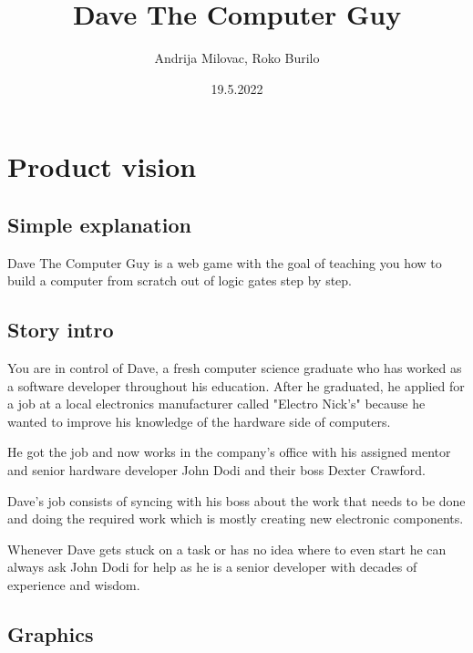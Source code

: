 \documentclass[12pt]{article}
\author{Andrija Milovac, Roko Burilo}
\title{Dave The Computer Guy}
\date{19.5.2022}
\begin{document}
\maketitle
\tableofcontents
\section{Product vision}
\subsection{Simple explanation}
Dave The Computer Guy is a web game with the goal of teaching you how to build a computer from scratch out of logic gates step by step.
\subsection{Story intro}

You are in control of Dave, a fresh computer science graduate who has worked as a software developer throughout his education.
After he graduated, he applied for a job at a local electronics manufacturer called "Electro Nick's" because he wanted to 
improve his knowledge of the hardware side of computers.

He got the job and now works in the company's office with his assigned mentor and senior hardware developer John Dodi and their boss Dexter Crawford.

Dave's job consists of syncing with his boss about the work that needs to be done and doing the required work which is mostly
creating new electronic components.

Whenever Dave gets stuck on a task or has no idea where to even start he can always ask John Dodi for help as he is a senior developer with
decades of experience and wisdom.

\subsection{Graphics}
\end{document}
